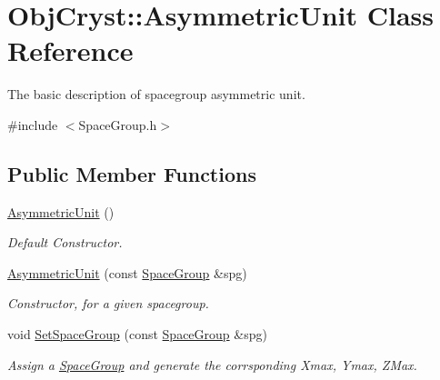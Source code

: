 \hypertarget{class_obj_cryst_1_1_asymmetric_unit}{}\section{Obj\+Cryst\+::Asymmetric\+Unit Class Reference}
\label{class_obj_cryst_1_1_asymmetric_unit}


The basic description of spacegroup asymmetric unit.  




{\ttfamily \#include $<$Space\+Group.\+h$>$}

\subsection*{Public Member Functions}
\begin{DoxyCompactItemize}
\item 
\mbox{\label{class_obj_cryst_1_1_asymmetric_unit_a747085c4da803b7653cc94d5f80a08e9}} 
\mbox{\hyperlink{class_obj_cryst_1_1_asymmetric_unit_a747085c4da803b7653cc94d5f80a08e9}{Asymmetric\+Unit}} ()
\begin{DoxyCompactList}\small\item\em Default Constructor. \end{DoxyCompactList}\item 
\mbox{\label{class_obj_cryst_1_1_asymmetric_unit_a382cdbb29b31cb1069cedfda111a7b52}} 
\mbox{\hyperlink{class_obj_cryst_1_1_asymmetric_unit_a382cdbb29b31cb1069cedfda111a7b52}{Asymmetric\+Unit}} (const \mbox{\hyperlink{class_obj_cryst_1_1_space_group}{Space\+Group}} \&spg)
\begin{DoxyCompactList}\small\item\em Constructor, for a given spacegroup. \end{DoxyCompactList}\item 
\mbox{\label{class_obj_cryst_1_1_asymmetric_unit_a74250a6135b809e1e5d4263babf7b78f}} 
void \mbox{\hyperlink{class_obj_cryst_1_1_asymmetric_unit_a74250a6135b809e1e5d4263babf7b78f}{Set\+Space\+Group}} (const \mbox{\hyperlink{class_obj_cryst_1_1_space_group}{Space\+Group}} \&spg)
\begin{DoxyCompactList}\small\item\em Assign a \mbox{\hyperlink{class_obj_cryst_1_1_space_group}{Space\+Group}} and generate the corrsponding Xmax, Ymax, Z\+Max. \end{DoxyCompactList}\item 

\end{DoxyCompactItemize}
